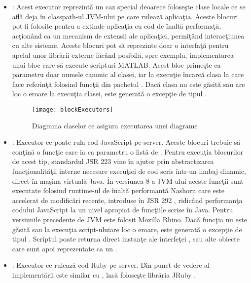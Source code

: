 \begin{itemize}
	\item {}: Acest executor reprezintă un caz special deoarece foloseşte clase locale ce se află deja în classpath-ul JVM-ului pe care rulează aplicaţia. Aceste blocuri pot fi folosite pentru a extinde aplicaţia cu cod de înaltă performaţă, acţionând ca un mecanism de extensii ale aplicaţiei, permiţând interacţiunea cu alte sisteme. Aceste blocuri pot să reprezinte doar o interfaţă pentru apelul unor librării externe făcând posibilă, spre exemplu, implementarea unui bloc care să execute scripturi MATLAB.
	Acest bloc primeşte ca parametru doar numele canonic al clasei, iar la execuţie încarcă clasa la care face referinţă folosind funcţii din pachetul . Dacă clasa nu este găsită sau are loc o eroare la execuţia clasei, este generată o excepţie de tipul .
	\begin{figure}[H]
		\centering
		\texttt{[image: blockExecutors]}
		\caption{Diagrama claselor ce asigura executarea unei diagrame}
		\label{fig:blockExecutors}
	\end{figure}
	\item {}: Executor ce poate rula cod JavaScript pe server. Aceste blocuri trebuie să conţină o funcţie  care ia ca parametru o listă de . Pentru execuţia blocurilor de acest tip, standardul JSR 223 \autocite{JSR223} vine în ajutor prin abstractizarea funcţionalităţii interne necesare execuţiei de cod scris într-un limbaj dinamic, direct în maşina virtuală Java. În versiunea 8 a JVM-ului aceste funcţii sunt executate folosind runtime-ul de înaltă performantă Nashorn care este accelerat de modificări recente, introduse în JSR 292  \autocite{JSR292}, ridicând performanţa codului JavaScript la un nivel apropiat de funcţiile scrise în Java. Pentru versiunile precedente de JVM este folosit Mozilla Rhino. Dacă funcţia  nu este găsită sau la execuţia script-uluiare loc o eroare, este generată o excepţie de tipul . Scriptul poate returna direct instanţe ale interfeţei , sau alte obiecte care sunt apoi reprezentate ca un .
	
	\item {}: Executor ce rulează cod Ruby pe server. Din punct de vedere al implementării este similar cu , însă foloseşte librăria JRuby \autocite{jruby} .
	
\end{itemize}

